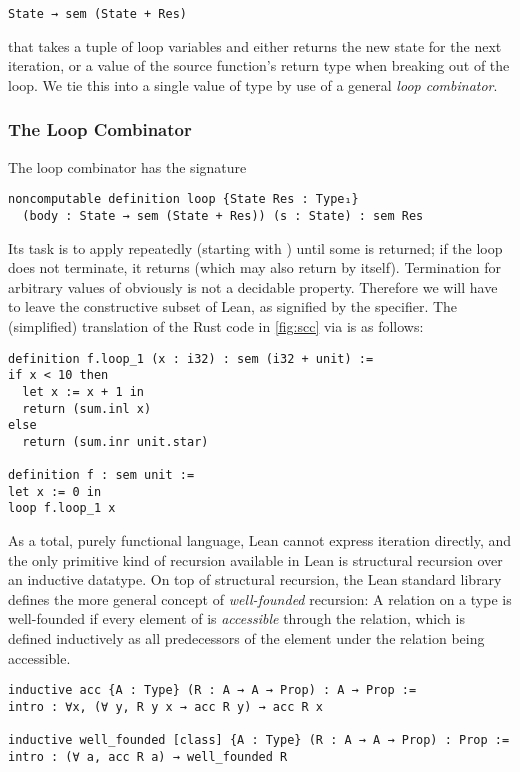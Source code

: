 \begin{verbatim}
State → sem (State + Res)
\end{verbatim}
that takes a tuple  of loop variables and either returns the new
state for the next iteration, or a value of the source function's return type
 when breaking out of the loop. We tie this into a single value of
type  by use of a general \emph{loop combinator}.

\subsubsection{The Loop Combinator}
\label{sec:loop}

The loop combinator has the signature

\begin{verbatim}
noncomputable definition loop {State Res : Type₁}
  (body : State → sem (State + Res)) (s : State) : sem Res
\end{verbatim}
Its task is to apply  repeatedly (starting with ) until some
 is returned; if the loop does not terminate, it returns 
(which  may also return by itself). Termination for arbitrary values
of  obviously is not a decidable property. Therefore we will have to leave
the constructive subset of Lean, as signified by the 
specifier. The (simplified) translation of the Rust code in \autoref{fig:scc} via
 is as follows:

\begin{verbatim}
definition f.loop_1 (x : i32) : sem (i32 + unit) :=
if x < 10 then
  let x := x + 1 in
  return (sum.inl x)
else
  return (sum.inr unit.star)

definition f : sem unit :=
let x := 0 in
loop f.loop_1 x
\end{verbatim}

As a total, purely functional language, Lean cannot express iteration directly,
and the only primitive kind of recursion available in Lean is structural recursion
over an inductive datatype. On top of structural recursion, the Lean standard
library defines the more general concept of \emph{well-founded} recursion: A
relation  on a type  is well-founded if every
element of  is \emph{accessible} through the relation, which is defined
inductively as all predecessors of the element under the relation being accessible.

\begin{verbatim}
inductive acc {A : Type} (R : A → A → Prop) : A → Prop :=
intro : ∀x, (∀ y, R y x → acc R y) → acc R x

inductive well_founded [class] {A : Type} (R : A → A → Prop) : Prop :=
intro : (∀ a, acc R a) → well_founded R
\end{verbatim}

